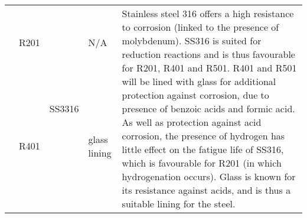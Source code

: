 {\begin{tabular}{@{}lp{5cm}p{2cm}p{2cm}p{12cm}@{}}
                                                      & R201                                                   & \multirow[t]{3}{=}{SS3316}                                                                & N/A                                               & \multirow[t]{3}{=}{Stainless steel 316 offers a high resistance to corrosion (linked to the presence of molybdenum). SS316 is suited for reduction reactions \cite{sinnott_coulson_2005} and is thus favourable for R201, R401 and R501. R401 and R501 will be lined with glass for additional protection against corrosion, due to presence of benzoic acids and formic acid. As well as protection against acid corrosion, the presence of hydrogen has little effect on the fatigue life of SS316, which is favourable for R201 (in which hydrogenation occurs). Glass is known for its resistance against acids, and is thus a suitable lining for the steel.}                                                                                                                                                                                                                                                                               \\ \cmidrule(l){2-2} \cmidrule(l){4-4}
                                                      & R401                                                   &                                                                                        & glass lining                                      &                                                                                                                                                                                                                                                                                                                                                                                                                                                                                                                                                                                                                                                                                                                                                                                                                                                                                                                    \\ \cmidrule(l){2-2} \cmidrule(l){4-4}

\end{tabular}}
